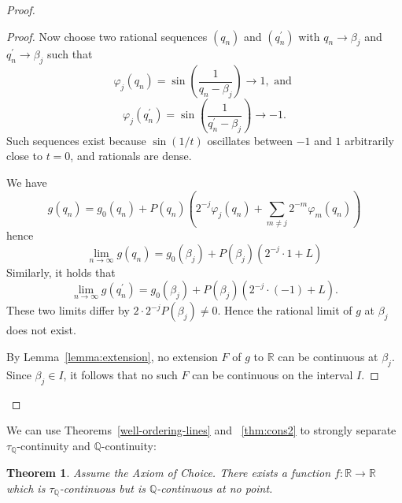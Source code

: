 \documentclass[11pt]{amsart} %
\newtheorem{theorem}{Theorem}[section]
\theoremstyle{definition}
\newcommand{\Q}{\mathbb{Q}}
\begin{document}
\begin{proof}
\begin{proof}
Now choose two rational sequences $(q_{n})$ and $(q_{n}^{\prime})$ with $q_{n}\rightarrow\beta_{j}$ and $q_{n}^{\prime}\rightarrow\beta_{j}$ such that
\begin{equation} 
\varphi_{j}(q_{n})=\sin\left(\frac{1}{q_{n}-\beta_{j}}\right)\rightarrow1, \mbox{ and }
\end{equation} 
\begin{equation} 
\varphi_{j}(q_{n}^{\prime})=\sin\left(\frac{1}{q_{n}^{\prime}-\beta_{j}}\right)\rightarrow-1. 
\end{equation} 
Such sequences exist because $\sin(1/t)$ oscillates between $-1$ and $1$ arbitrarily close to $t=0$, and rationals are dense.

We have 
\begin{equation} 
g(q_{n})=g_{0}(q_{n})+P(q_{n})\left(2^{-j}\varphi_{j}(q_{n})+\sum_{m\ne j}2^{-m}\varphi_{m}(q_{n})\right)
\end{equation} 
hence 
\begin{equation} 
\lim_{n\rightarrow \infty} g(q_n)= g_{0}(\beta_{j})+P(\beta_{j})(2^{-j}\cdot1+L)
\end{equation} 
Similarly, it holds that 
\begin{equation} 
\lim_{n\rightarrow \infty} g(q_{n}^{\prime})= g_{0}(\beta_{j})+P(\beta_{j})(2^{-j}\cdot(-1)+L). 
\end{equation} 
These two limits differ by $2\cdot2^{-j}P(\beta_{j})\ne0$. Hence the rational limit of $g$ at $\beta_{j}$ does not exist.
 

By Lemma~\ref{lemma:extension}, no extension $F$ of $g$ to $\mathbb{R}$ can be continuous at $\beta_{j}$. Since $\beta_{j}\in I$, it follows that no such $F$ can be continuous on the interval $I$.
\end{proof}
\end{proof} 

We can use Theorems~\ref{well-ordering-lines} and ~\ref{thm:cons2} to strongly separate $\tau_{\Q}$-continuity and 
$\mathbb Q$-continuity: 

\begin{theorem}\label{thm:tauQ-nowhere-Q}
Assume the Axiom of Choice. There exists a function
$f\colon\mathbb R\to\mathbb R$ which is $\tau_{\Q}$-continuous but is
$\mathbb Q$-continuous at no point.
\end{theorem}
\end{document}
